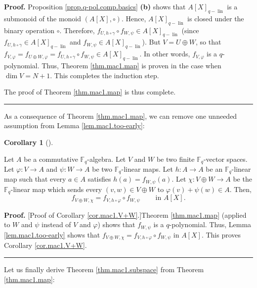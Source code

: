 \documentclass[numbers=enddot,12pt,final,onecolumn,notitlepage]{scrartcl}%
\theoremstyle{definition}
\newtheorem{coro}[theo]{Corollary}
\newenvironment{corollary}[1][]
{\begin{coro}[#1]\begin{leftbar}}
{\end{leftbar}\end{coro}}
\newenvironment{proof}[1][Proof]{\noindent\textbf{#1.} }{\ \rule{0.5em}{0.5em}}
\begin{document}
\begin{proof}
Proposition \ref{prop.q-pol.comp.basics} \textbf{(b)} shows that $A\left[
X\right]  _{q-\operatorname*{lin}}$ is a submonoid of the monoid $\left(
A\left[  X\right]  ,\circ\right)  $. Hence, $A\left[  X\right]
_{q-\operatorname*{lin}}$ is closed under the binary operation $\circ$.
Therefore, $f_{U,h\circ\gamma}\circ f_{W,\psi}\in A\left[  X\right]
_{q-\operatorname*{lin}}$ (since $f_{U,h\circ\gamma}\in A\left[  X\right]
_{q-\operatorname*{lin}}$ and $f_{W,\psi}\in A\left[  X\right]
_{q-\operatorname*{lin}}$). But $V=U\oplus W$, so that $f_{V,\varphi
}=f_{U\oplus W,\varphi}=f_{U,h\circ\gamma}\circ f_{W,\psi}\in A\left[
X\right]  _{q-\operatorname*{lin}}$. In other words, $f_{V,\varphi}$ is a
$q$-polynomial. Thus, Theorem \ref{thm.mac1.map} is proven in the case when
$\dim V=N+1$. This completes the induction step.

The proof of Theorem \ref{thm.mac1.map} is thus complete.
\end{proof}

As a consequence of Theorem \ref{thm.mac1.map}, we can remove one unneeded
assumption from Lemma \ref{lem.mac1.too-early}:

\begin{corollary}
\label{cor.mac1.V+W}Let $A$ be a commutative $\mathbb{F}_{q}$-algebra. Let $V$
and $W$ be two finite $\mathbb{F}_{q}$-vector spaces. Let $\varphi
:V\rightarrow A$ and $\psi:W\rightarrow A$ be two $\mathbb{F}_{q}$-linear
maps. Let $h:A\rightarrow A$ be an $\mathbb{F}_{q}$-linear map such that every
$a\in A$ satisfies $h\left(  a\right)  =f_{W,\psi}\left(  a\right)  $. Let
$\chi:V\oplus W\rightarrow A$ be the $\mathbb{F}_{q}$-linear map which sends
every $\left(  v,w\right)  \in V\oplus W$ to $\varphi\left(  v\right)
+\psi\left(  w\right)  \in A$. Then,%
\[
f_{V\oplus W,\chi}=f_{V,h\circ\varphi}\circ f_{W,\psi}%
\ \ \ \ \ \ \ \ \ \ \text{in }A\left[  X\right]  .
\]

\end{corollary}

\begin{proof}
[Proof of Corollary \ref{cor.mac1.V+W}.]Theorem \ref{thm.mac1.map} (applied to
$W$ and $\psi$ instead of $V$ and $\varphi$) shows that $f_{W,\psi}$ is a
$q$-polynomial. Thus, Lemma \ref{lem.mac1.too-early} shows that $f_{V\oplus
W,\chi}=f_{V,h\circ\varphi}\circ f_{W,\psi}$ in $A\left[  X\right]  $. This
proves Corollary \ref{cor.mac1.V+W}.
\end{proof}

Let us finally derive Theorem \ref{thm.mac1.subspace} from Theorem
\ref{thm.mac1.map}:
\end{document}

